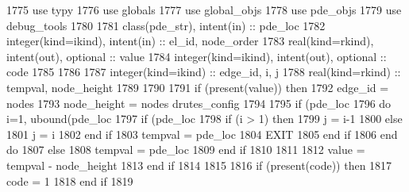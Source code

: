 \begin{DoxyCode}
1775         \textcolor{keywordtype}{use }typy
1776         \textcolor{keywordtype}{use }globals
1777         \textcolor{keywordtype}{use }global_objs
1778         \textcolor{keywordtype}{use }pde_objs
1779         \textcolor{keywordtype}{use }debug_tools
1780         
1781         \textcolor{keywordtype}{class}(pde_str), \textcolor{keywordtype}{intent(in)} :: pde\_loc
1782         \textcolor{keywordtype}{integer(kind=ikind)}, \textcolor{keywordtype}{intent(in)}  :: el\_id, node\_order
1783         \textcolor{keywordtype}{real(kind=rkind)}, \textcolor{keywordtype}{intent(out)}, \textcolor{keywordtype}{optional}    :: value
1784         \textcolor{keywordtype}{integer(kind=ikind)}, \textcolor{keywordtype}{intent(out)}, \textcolor{keywordtype}{optional} :: code
1785 
1786         
1787         \textcolor{keywordtype}{integer(kind=ikind)} :: edge\_id, i, j
1788         \textcolor{keywordtype}{real(kind=rkind)} :: tempval, node\_height
1789         
1790 
1791         \textcolor{keywordflow}{if} (\textcolor{keyword}{present}(\textcolor{keywordtype}{value})) \textcolor{keywordflow}{then}
1792           edge\_id = nodes%
1793           node\_height = nodes%
      drutes_config%
1794 
1795           \textcolor{keywordflow}{if} (pde\_loc%
1796             \textcolor{keywordflow}{do} i=1, ubound(pde\_loc%
1797               \textcolor{keywordflow}{if} (pde\_loc%
1798                 \textcolor{keywordflow}{if} (i > 1) \textcolor{keywordflow}{then}
1799                   j = i-1
1800                 \textcolor{keywordflow}{else}
1801                   j = i
1802 \textcolor{keywordflow}{                end if}
1803                 tempval = pde\_loc%
1804                 \textcolor{keywordflow}{EXIT}
1805 \textcolor{keywordflow}{              end if}
1806 \textcolor{keywordflow}{            end do}
1807           \textcolor{keywordflow}{else}
1808             tempval =  pde\_loc%
1809 \textcolor{keywordflow}{          end if}
1810 
1811           
1812           \textcolor{keywordtype}{value} = tempval - node\_height
1813 \textcolor{keywordflow}{        end if}
1814 
1815         
1816         \textcolor{keywordflow}{if} (\textcolor{keyword}{present}(code)) \textcolor{keywordflow}{then}
1817           code = 1
1818 \textcolor{keywordflow}{        end if}
1819         
\end{DoxyCode}


